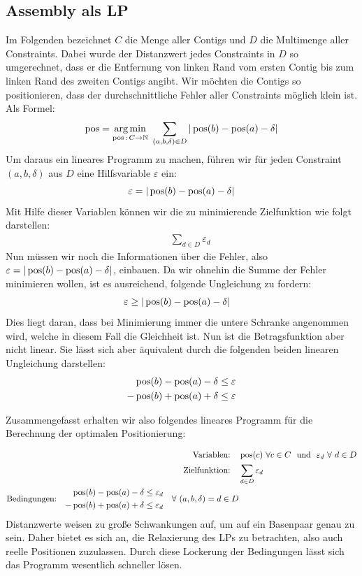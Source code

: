 \subsection{Assembly als LP}
Im Folgenden bezeichnet $C$ die Menge aller Contigs und $D$ die Multimenge aller Constraints. Dabei wurde der Distanzwert jedes Constraints in $D$ so umgerechnet, dass er die Entfernung von linken Rand vom ersten Contig bis zum linken Rand des zweiten Contigs angibt.
Wir möchten die Contigs so positionieren, dass der durchschnittliche Fehler aller Constraints möglich klein ist. Als Formel:
\[ \operatorname*{pos} = \operatorname*{arg\,min}_{\operatorname*{pos}\,:\, C \rightarrow \mathbb{N}} \ \sum_{(a,b,\delta) \in D} |\operatorname*{pos}(b) - \operatorname*{pos}(a) - \delta| \] 
Um daraus ein lineares Programm zu machen, führen wir für jeden Constraint $(a,b,\delta)$ aus $D$ eine Hilfsvariable $\varepsilon$ ein:
\[ \varepsilon = |\operatorname*{pos}(b) - \operatorname*{pos}(a) - \delta| \]
Mit Hilfe dieser Variablen können wir die zu minimierende Zielfunktion wie folgt darstellen:
\begin{align*}
\quad& \sum_{d \in D} \varepsilon_{d}
\end{align*}
Nun müssen wir noch die Informationen über die Fehler, also $\varepsilon = |\operatorname*{pos}(b) - \operatorname*{pos}(a) - \delta|$, einbauen. Da wir ohnehin die Summe der Fehler minimieren wollen, ist es ausreichend, folgende Ungleichung zu fordern:
\begin{align*}
\varepsilon \geq |\operatorname*{pos}(b) &- \operatorname*{pos}(a) - \delta|
\end{align*}
Dies liegt daran, dass bei Minimierung immer die untere Schranke angenommen wird, welche in diesem Fall die Gleichheit ist. Nun ist die Betragsfunktion aber nicht linear. Sie lässt sich aber äquivalent durch die folgenden beiden linearen Ungleichung darstellen:
\begin{align*}
\operatorname*{pos}(b) - \operatorname*{pos}(a) - \delta &\leq \varepsilon\\
-\operatorname*{pos}(b) + \operatorname*{pos}(a) + \delta &\leq \varepsilon
\end{align*}

Zusammengefasst erhalten wir also folgendes lineares Programm für die Berechnung der optimalen Positionierung:

\begin{align*}
\text{Variablen:}\quad& \pos(c) \ \forall c \in C \ \ \text{und} \ \ \varepsilon_{d} \ \forall \ d \in D\\
\text{Zielfunktion:}\quad& \sum_{d \in D} \varepsilon_{d}\\
\text{Bedingungen:}\quad \begin{split} \pos(b) - \pos(a) - \delta \leq \varepsilon_{d}\\
-\pos(b) + \pos(a) + \delta \leq \varepsilon_{d} \end{split}\quad \forall \ (a,b,\delta) = d \in D
\end{align*}
Distanzwerte weisen zu große Schwankungen auf, um auf ein Basenpaar genau zu sein. Daher bietet es sich an, die Relaxierung des LPs zu betrachten, also auch reelle Positionen zuzulassen. Durch diese Lockerung der Bedingungen lässt sich das Programm wesentlich schneller lösen.

